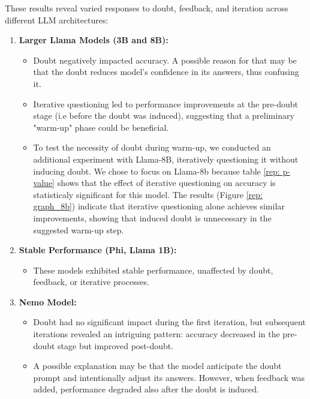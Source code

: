 These results reveal varied responses to doubt, feedback, and iteration across different LLM architectures:

\begin{enumerate}
  \item \textbf{Larger Llama Models (3B and 8B):}
    \begin{itemize}
      \item Doubt negatively impacted accuracy. A possible reason for that may be that the doubt reduces model's confidence in its answers, thus confusing it.
      \item Iterative questioning led to performance improvements at the pre-doubt stage (i.e before the doubt was induced), suggesting that a preliminary "warm-up" phase could be beneficial.
      \item To test the necessity of doubt during warm-up, we conducted an additional experiment with Llama-8B, iteratively questioning it without inducing doubt. We chose to focus on Llama-8b because table \ref{rep: p-value} shows that the effect of iterative questioning on accuracy is statisticaly significant for this model. The results (Figure \ref{rep: graph_8b}) indicate that iterative questioning alone achieves similar improvements, showing that induced doubt is unnecessary in the suggested warm-up step.
    \end{itemize}
  \item \textbf{Stable Performance (Phi, Llama 1B):}
    \begin{itemize}
      \item These models exhibited stable performance, unaffected by doubt, feedback, or iterative processes.
    \end{itemize}
  \item \textbf{Nemo Model:}
    \begin{itemize}
      \item Doubt had no significant impact during the first iteration, but subsequent iterations revealed an intriguing pattern: accuracy decreased in the pre-doubt stage but improved post-doubt.
      \item A possible explanation may be that the model anticipate the doubt prompt and intentionally adjust its answers. However, when feedback was added, performance degraded also after the doubt is induced.
    \end{itemize}
\end{enumerate}
